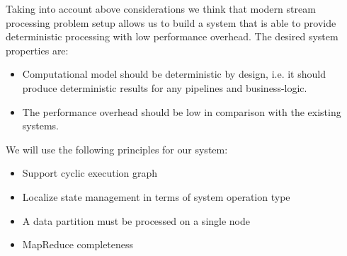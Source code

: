 Taking into account above considerations we think that 
modern stream processing problem setup allows us to build a system that is able to provide deterministic processing with low performance overhead. The desired system properties are:
\begin{itemize}
    \item Computational model should be deterministic by design, i.e. it should produce deterministic results for any pipelines and business-logic.
    \item The performance overhead should be low in comparison with the existing systems.
\end{itemize}
We will use the following principles for our system:
\begin{itemize}
    \item Support cyclic execution graph
    \item Localize state management in terms of system operation type
    \item A data partition must be processed on a single node
    \item MapReduce completeness
\end{itemize}
